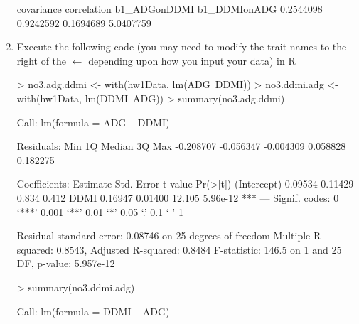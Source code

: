 \documentclass[12pt,a4paper]{paper}
\begin{document}
\begin{enumerate}
\begin{Schunk}
\begin{Soutput}
  covariance  correlation b1_ADGonDDMI b1_DDMIonADG 
   0.2544098    0.9242592    0.1694689    5.0407759 
\end{Soutput}
\end{Schunk}
\item Execute the following code (you may need to modify the trait names to the right
of the $\leftarrow$ depending upon how you input your data) in R
\begin{Schunk}
\begin{Sinput}
> no3.adg.ddmi <-  with(hw1Data, lm(ADG~DDMI))
> no3.ddmi.adg <-  with(hw1Data, lm(DDMI~ADG))
> summary(no3.adg.ddmi)
\end{Sinput}
\begin{Soutput}
Call:
lm(formula = ADG ~ DDMI)

Residuals:
      Min        1Q    Median        3Q       Max 
-0.208707 -0.056347 -0.004309  0.058828  0.182275 

Coefficients:
            Estimate Std. Error t value Pr(>|t|)    
(Intercept)  0.09534    0.11429   0.834    0.412    
DDMI         0.16947    0.01400  12.105 5.96e-12 ***
---
Signif. codes:  0 ‘***’ 0.001 ‘**’ 0.01 ‘*’ 0.05 ‘.’ 0.1 ‘ ’ 1

Residual standard error: 0.08746 on 25 degrees of freedom
Multiple R-squared:  0.8543,	Adjusted R-squared:  0.8484 
F-statistic: 146.5 on 1 and 25 DF,  p-value: 5.957e-12
\end{Soutput}
\begin{Sinput}
> summary(no3.ddmi.adg)
\end{Sinput}
\begin{Soutput}
Call:
lm(formula = DDMI ~ ADG)


\end{Soutput}
\end{Schunk}
\end{enumerate}
\end{document}
